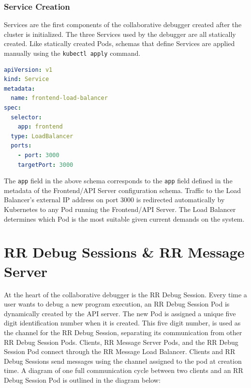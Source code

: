 \documentclass[12pt]{article}
\begin{document}
\subsubsection{Service Creation}

Services are the first components of the collaborative debugger
created after the cluster is initialized.  The three Services used by
the debugger are all statically created.  Like statically created
Pods, schemas that define Services are applied manually using the
\lstinline{kubectl apply} command.

\begin{lstlisting}[language=YAML,basicstyle=\linespread{0.5}\ttfamily,caption={Frontend Load Balancer Schema},captionpos=b]
apiVersion: v1
kind: Service
metadata:
  name: frontend-load-balancer
spec:
  selector:
    app: frontend
  type: LoadBalancer
  ports:
    - port: 3000
    targetPort: 3000
\end{lstlisting}

The \lstinline{app} field in the above schema corresponds to the
\lstinline{app} field defined in the metadata of the Frontend/API
Server configuration schema.  Traffic to the Load Balancer's external
IP address on port 3000 is redirected automatically by Kubernetes to
any Pod running the Frontend/API Server.  The Load Balancer determines
which Pod is the most suitable given current demands on the system.

\section{RR Debug Sessions \& RR Message Server}

At the heart of the collaborative debugger is the RR Debug Session.
Every time a user wants to debug a new program execution, an RR Debug
Session Pod is dynamically created by the API server.  The new Pod is
assigned a unique five digit identification number when it is created.
This five digit number, is used as the channel for the RR Debug
Session, separating its communication from other RR Debug Session
Pods.  Clients, RR Message Server Pods, and the RR Debug Session Pod
connect through the RR Message Load Balancer.  Clients and RR Debug
Sessions send messages using the channel assigned to the pod at
creation time.  A diagram of one full communication cycle between two
clients and an RR Debug Session Pod is outlined in the diagram below:
\end{document}
